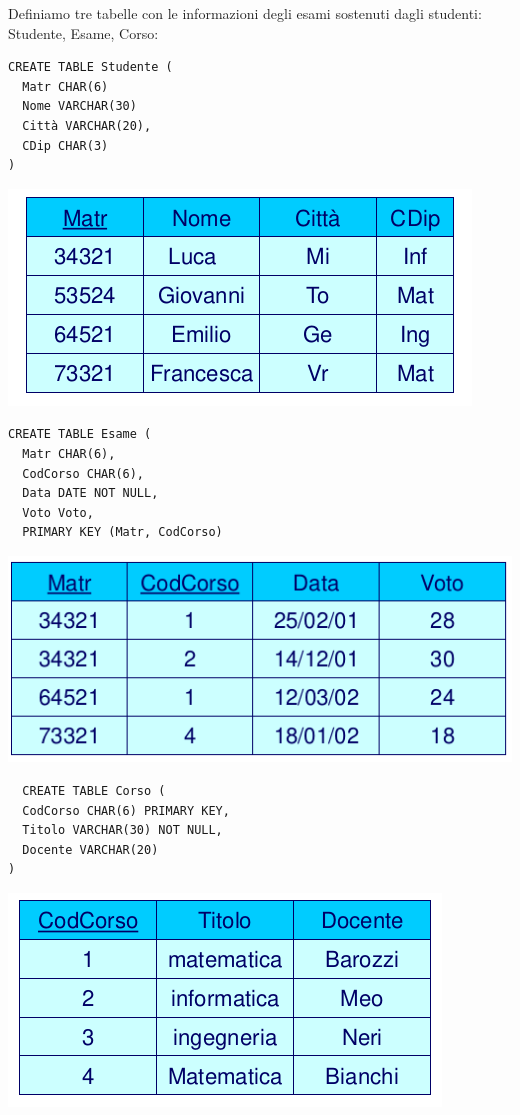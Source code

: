 \documentclass[a4paper,12pt, oneside]{book}
\begin{document}
\begin{esempio}
Definiamo tre tabelle con le informazioni degli esami
sostenuti dagli studenti: Studente, Esame, Corso:
\begin{verbatim}
CREATE TABLE Studente (
  Matr CHAR(6)
  Nome VARCHAR(30)
  Città VARCHAR(20),
  CDip CHAR(3)
)
\end{verbatim}
\begin{center}
\includegraphics[scale=0.7]{img/st.png}
\end{center}
\begin{verbatim}
CREATE TABLE Esame (
  Matr CHAR(6),
  CodCorso CHAR(6),
  Data DATE NOT NULL,
  Voto Voto,
  PRIMARY KEY (Matr, CodCorso)
\end{verbatim}
\begin{center}
\includegraphics[scale=0.7]{img/es.png}
\end{center}
\begin{verbatim}
  CREATE TABLE Corso (
  CodCorso CHAR(6) PRIMARY KEY,
  Titolo VARCHAR(30) NOT NULL,
  Docente VARCHAR(20)
)
\end{verbatim}
\begin{center}
\includegraphics[scale=0.7]{img/sc.png}

\end{center}
\end{esempio}
\end{document}
